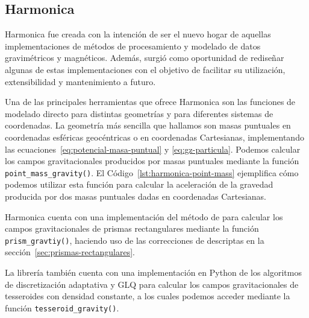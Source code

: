 \subsection{Harmonica}
\label{sec:harmonica}

Harmonica fue creada con la intención de ser el nuevo hogar de aquellas
implementaciones de métodos de procesamiento y modelado de datos gravimétricos
y magnéticos.
Además, surgió como oportunidad de rediseñar algunas de estas implementaciones
con el objetivo de facilitar su utilización, extensibilidad y mantenimiento
a futuro.

Una de las principales herramientas que ofrece Harmonica son las
funciones de modelado directo para distintas geometrías y para diferentes
sistemas de coordenadas.
La geometría más sencilla que hallamos son masas puntuales en coordenadas
esféricas geocéntricas o en coordenadas Cartesianas, implementando las
ecuaciones~\ref{eq:potencial-masa-puntual} y \ref{eq:gz-particula}.
Podemos calcular los campos gravitacionales producidos por masas puntuales
mediante la función \texttt{point\_mass\_gravity()}.
El Código~\ref{lst:harmonica-point-mass} ejemplifica cómo podemos utilizar esta
función para calcular la aceleración de la gravedad producida por dos masas
puntuales dadas en coordenadas Cartesianas.

Harmonica cuenta con una implementación del método de \citet{nagy2000} para
calcular los campos gravitacionales de prismas rectangulares mediante la
función \texttt{prism\_gravtiy()}, haciendo uso de las correcciones de
\citet{fukushima2020} descriptas en la sección~\ref{sec:prismas-rectangulares}.

La librería también cuenta con una implementación en Python de los algoritmos
de discretización adaptativa y \ac{GLQ} para calcular los campos
gravitacionales de tesseroides con densidad constante, a los cuales podemos
acceder mediante la función \texttt{tesseroid\_gravity()}.



